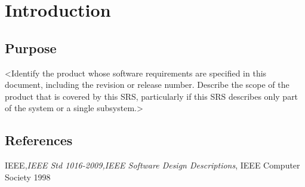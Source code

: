 \chapter{Introduction} \label{cap:cap1}

\section{Purpose}
<Identify the product whose software requirements are specified in this document, including the revision or release number. Describe the scope of the product that is covered by this SRS, particularly if this SRS describes only part of the system or a single subsystem.>



\section{References}
IEEE,{\it IEEE Std 1016-2009,IEEE Software Design Descriptions},  IEEE Computer Society 1998
 